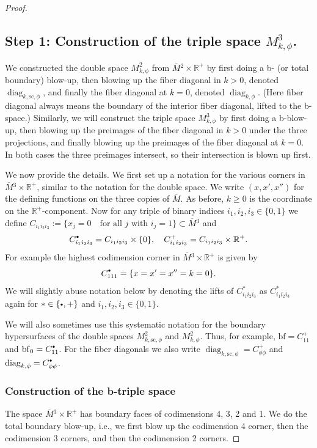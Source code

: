 \documentclass[11pt]{article}
\newcommand{\ie}{i.e.,\xspace}
\numberwithin{equation}{section}
\newcommand{\bbullet}{{\scriptscriptstyle\bullet}}
\newcommand{\sbullet}{{\raisebox{1pt}{$\bbullet$}}}
\theoremstyle{plain}
\theoremstyle{definition}
\newcommand{\R}{{\mathbb{R}}}
\newcommand{\bbf}{{\mathrm{bf}}}
\newcommand{\ssc}{{\mathrm{sc}}}
\DeclareMathOperator\diag{diag}
\newcommand{\Mbar}{{\overline{M}}}\let\M\Mbar
\begin{document}
\begin{proof}
\subsection*{Step 1: Construction of the triple space $M^{3}_{k,\phi}$.}
We constructed the double space $M^2_{k,\phi}$ from $\Mbar{}^2\times\R^+$ by first doing a b- (or total boundary) blow-up, then blowing up the fiber diagonal in $k>0$, denoted $\diag_{k,\ssc,\phi}$, and finally the fiber diagonal at $k=0$, denoted $\diag_{k,\phi}$. (Here fiber diagonal always means the boundary of the interior fiber diagonal, lifted to the b-space.)
Similarly, we will construct the triple space $M^3_{k,\phi}$ by first doing a b-blow-up, then blowing up the preimages of the fiber diagonal in $k>0$ under the three projections, and finally blowing up the preimages of the fiber diagonal at $k=0$. In both cases the three preimages intersect, so their intersection is blown up first.

We now provide the details.
We first set up a notation for the various corners in $\Mbar{}^3\times \R^+$, similar to the notation for the double space. We write $(x,x',x'')$
for the defining functions on the three copies of $\Mbar$. As before, $k\geq 0$ is the coordinate on the
$\R^+$-component.
Now for any triple of binary indices $i_1,i_2,i_3 \in \{0,1\}$ we define
$
C_{i_1i_2i_3} := \{x_j = 0\quad \text{for all $j$ with } i_j = 1\} \subset \Mbar{}^3
$
and
\[
C_{i_1i_2i_3}^\sbullet = C_{i_1i_2i_3}\times \{0\},\quad C_{i_1i_2i_3}^+ = C_{i_1i_2i_3} \times \R^+.
\]
For example the highest codimension corner in $\Mbar{}^3\times \R^+$ is given by
\[
C_{111}^\sbullet = \{ x = x' = x'' = k =0\}.
\]
We will slightly abuse notation below by denoting the lifts of $C_{i_1i_2i_3}^{\ast}$ as $C_{i_1i_2i_3}^{\ast}$ again for $\ast\in\{\sbullet,+\}$ and $i_1,i_2,i_3\in\{0,1\}$.

We will also sometimes use this systematic notation for the boundary hypersurfaces of the double spaces $M^2_{k,\ssc,\phi}$ and $M^2_{k,\phi}$. Thus, for example, $\bbf=C_{11}^+$ and $\bbf_0=C_{11}^\sbullet$. For the fiber diagonals we also write $\diag_{k,\ssc,\phi}=C_{\phi\phi}^+$ and $\diag_{k,\phi}=C_{\phi\phi}^\sbullet$.

\subsubsection* {Construction of the b-triple space}
The space $\Mbar{}^3\times \R^+$ has boundary faces of codimensions 4, 3, 2 and 1. We do the total boundary blow-up, \ie we first blow up the codimension 4 corner, then the codimension 3 corners, and then the codimension 2 corners.


\end{proof}
\end{document}
